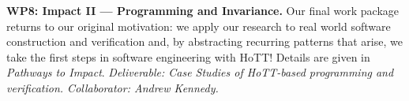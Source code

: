 \documentclass[a4paper,11pt]{article}
\begin{document}




{\bf WP8: Impact II --- Programming and Invariance.} %
Our final work package returns to our original motivation:
we apply our research to real world software construction and
verification and, by abstracting recurring patterns that
arise, we take the first steps in software engineering with HoTT!
Details are given in {\em Pathways to
  Impact}. {\em Deliverable: Case Studies of HoTT-based programming
  and verification. 
Collaborator: Andrew Kennedy.
}
\end{document}
